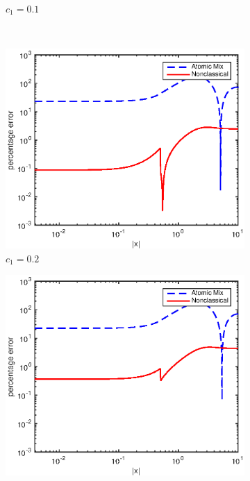 \documentclass[12pt]{article}
\begin{document}
{\begin{figure}[p]
\begin{subfigure}{0.495\textwidth}
        \caption{$c_1 = 0.1$}
        \label{figerrD10}
    \end{subfigure}
    \\
    \centering
    \begin{subfigure}{0.495\textwidth}
        \centering
        \includegraphics[width=\textwidth]{NSE_err_D20.eps}
        \caption{$c_1 = 0.2$}
        \label{figerrD20}
    \end{subfigure}
    \hfill
    \begin{subfigure}{0.495\textwidth}
        \centering
        \includegraphics[width=\textwidth]{NSE_err_D30.eps}

\end{subfigure}
\end{figure}}
\end{document}
